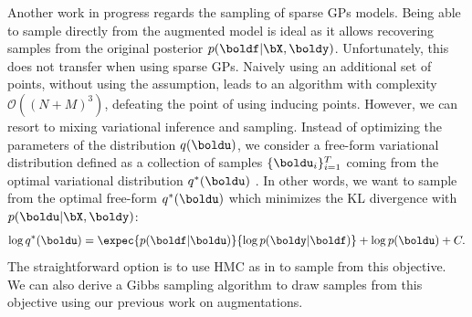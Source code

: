Another work in progress regards the sampling of sparse \ac{GPs} models.
Being able to sample directly from the augmented model is ideal as it allows recovering samples from the original posterior $p(\boldf|\bX,\boldy)$.
Unfortunately, this does not transfer when using sparse \ac{GPs}.
Naively using an additional set of points, without using the \citet{Titsias2009} assumption, leads to an algorithm with complexity $\mathcal{O}((N+M)^3)$, defeating the point of using inducing points.
However, we can resort to mixing variational inference and sampling.
Instead of optimizing the parameters of the distribution $q(\boldu)$, we consider a free-form variational distribution defined as a collection of samples $\{\boldu_i\}_{i=1}^T$ coming from the optimal variational distribution $q^*(\boldu)$ \cite{hensmanMCMCVariationallySparse2015}.
In other words, we want to sample from the optimal free-form $q^*(\boldu)$ which minimizes the \ac{KL} divergence with $p(\boldu|\bX,\boldy)$:
\begin{align*}
    \log q^*(\boldu) = \expec{p(\boldf|\boldu)}{\log p(\boldy|\boldf)} + \log p(\boldu) + C.
\end{align*}
The straightforward option is to use \ac{HMC} as in \cite{hensmanMCMCVariationallySparse2015} to sample from this objective.
We can also derive a Gibbs sampling algorithm to draw samples from this objective using our previous work on augmentations.

